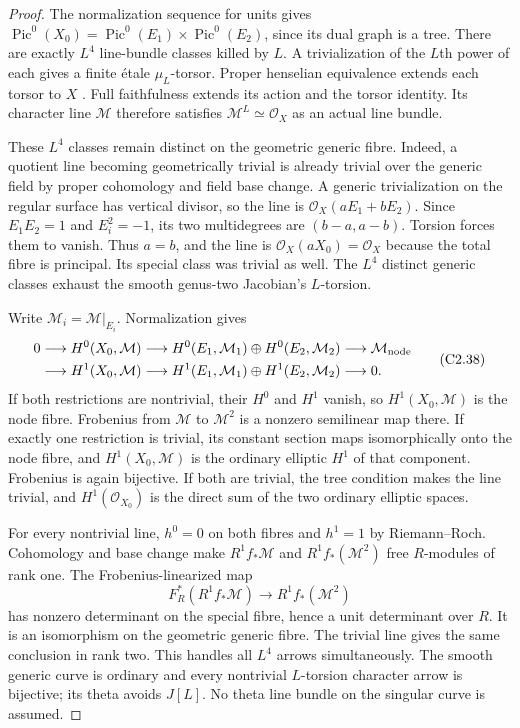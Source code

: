 \begin{proof}
The normalization sequence for units gives
$\operatorname{Pic}^0(X_0)=\operatorname{Pic}^0(E_1)\times
\operatorname{Pic}^0(E_2)$, since its dual graph is a tree.
There are exactly $L^4$ line-bundle classes killed by $L$.
A trivialization of the $L$th power of each gives a finite
\'etale $\mu_L$-torsor. Proper henselian equivalence extends
each torsor to $X$
\citep[Lemma 58.9.1, tag 0A48]{A_StacksProperHenselian}.
Full faithfulness extends its action and the torsor identity.
Its character line $\mathcal M$ therefore satisfies
$\mathcal M^L\simeq\mathcal O_X$ as an actual line bundle.

These $L^4$ classes remain distinct on the geometric generic
fibre. Indeed, a quotient line becoming geometrically trivial
is already trivial over the generic field by proper cohomology
and field base change. A generic trivialization on the
regular surface has vertical divisor, so the line is
$\mathcal O_X(aE_1+bE_2)$. Since $E_1E_2=1$ and
$E_i^2=-1$, its two multidegrees are $(b-a,a-b)$.
Torsion forces them to vanish. Thus $a=b$, and the line
is $\mathcal O_X(aX_0)=\mathcal O_X$ because the total
fibre is principal. Its special class was trivial as well.
The $L^4$ distinct generic classes exhaust the smooth
genus-two Jacobian's $L$-torsion.

Write $\mathcal M_i=\mathcal M|_{E_i}$. Normalization gives
\[
 \begin{aligned}
 0&\longrightarrow H^0(X_0,\mathcal M)
 \longrightarrow H^0(E_1,\mathcal M_1)\oplus H^0(E_2,\mathcal M_2)
 \longrightarrow\mathcal M_{\rm node}\\
 &\longrightarrow H^1(X_0,\mathcal M)
 \longrightarrow H^1(E_1,\mathcal M_1)\oplus H^1(E_2,\mathcal M_2)
 \longrightarrow0 .
 \end{aligned}                                                   \tag{C2.38}
\]
If both restrictions are nontrivial, their $H^0$ and $H^1$
vanish, so $H^1(X_0,\mathcal M)$ is the node fibre.
Frobenius from $\mathcal M$ to $\mathcal M^2$ is a nonzero
semilinear map there. If exactly one restriction is trivial,
its constant section maps isomorphically onto the node fibre,
and $H^1(X_0,\mathcal M)$ is the ordinary elliptic $H^1$
of that component. Frobenius is again bijective.
If both are trivial, the tree condition makes the line
trivial, and $H^1(\mathcal O_{X_0})$ is the direct sum of
the two ordinary elliptic spaces.

For every nontrivial line, $h^0=0$ on both fibres and
$h^1=1$ by Riemann--Roch. Cohomology and base change make
$R^1f_*\mathcal M$ and $R^1f_*(\mathcal M^2)$ free
$R$-modules of rank one. The Frobenius-linearized map
\[
 F_R^*(R^1f_*\mathcal M)\longrightarrow R^1f_*(\mathcal M^2)
\]
has nonzero determinant on the special fibre, hence a unit
determinant over $R$. It is an isomorphism on the geometric
generic fibre. The trivial line gives the same conclusion
in rank two. This handles all $L^4$ arrows simultaneously.
The smooth generic curve is ordinary and every nontrivial
$L$-torsion character arrow is bijective; its theta avoids
$J[L]$. No theta line bundle on the singular curve is assumed.


\end{proof}
